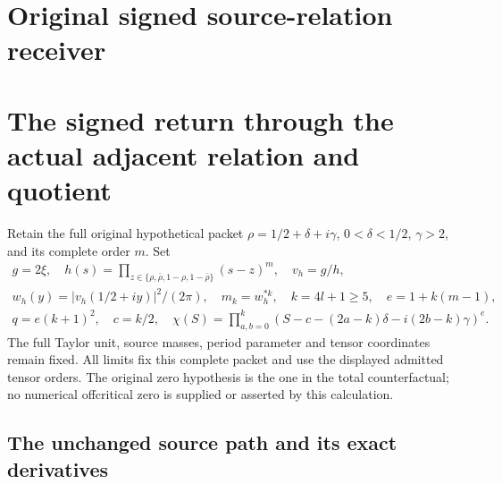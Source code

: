 \section*{Original signed source-relation receiver}
\begingroup
\section{The signed return through the actual adjacent relation and quotient}
\label{sxr:sec:sxr}

Retain the full original hypothetical packet
$\rho=1/2+\delta+i\gamma$, $0<\delta<1/2$, $\gamma>2$, and its
complete order $m$. Set
\begin{equation}\tag{SXR1}
\begin{gathered}
 g=2\xi,\quad h(s)=\prod_{z\in\{\rho,\bar\rho,1-\rho,1-\bar\rho\}}
                    (s-z)^m,\quad v_h=g/h,\\
 w_h(y)=|v_h(1/2+iy)|^2/(2\pi),\quad m_k=w_h^{*k},\quad
 k=4l+1\ge5,\quad e=1+k(m-1),\\
 q=e(k+1)^2,\quad c=k/2,\quad
 \chi(S)=\prod_{a,b=0}^k
  (S-c-(2a-k)\delta-i(2b-k)\gamma)^e.
\end{gathered}
\end{equation}
The full Taylor unit, source masses, period parameter and tensor
coordinates remain fixed. All limits fix this complete packet and
use the displayed admitted tensor orders. The original zero hypothesis
is the one in the total counterfactual; no numerical offcritical zero
is supplied or asserted by this calculation.

\subsection{The unchanged source path and its exact derivatives}

